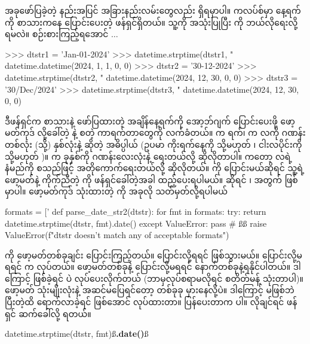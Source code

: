 အခုဖော်ပြခဲ့တဲ့ နည်းအပြင် အခြားနည်းလမ်းတွေလည်း ရှိရမှာပါ။  ကလပ်စ်မှာ နေ့ရက်ကို စာသားကနေ  ပြောင်းပေးတဲ့  ဖန်ရှင်ရှိတယ်။ သူ့ကို အသုံးပြုပြီး  ကို ဘယ်လိုရေးလို့ ရမလဲ။ စဉ်းစားကြည့်ရအောင် $\ldots$

\begin{codetxt}
>>> dtstr1 = 'Jan-01-2024'
>>> datetime.strptime(dtstr1, "%
datetime.datetime(2024, 1, 1, 0, 0)
>>> dtstr2 = '30-12-2024'
>>> datetime.strptime(dtstr2, "%
datetime.datetime(2024, 12, 30, 0, 0)
>>> dtstr3 = '30/Dec/2024'
>>> datetime.strptime(dtstr3, "%
datetime.datetime(2024, 12, 30, 0, 0)
\end{codetxt}
ဒီဖန်ရှင်က စာသားနဲ့ ဖော်ပြထားတဲ့ အချိန်နေ့ရက်ကို  အော့ဘ်ဂျက် ပြောင်းပေးဖို့ ဖော့မတ်ကုဒ်  လို့ခေါ်တဲ့ \fCode{\%} နဲ့ စတဲ့ ကာရက်တာတွေကို လက်ခံတယ်။  က ရက်၊  က   လကို ဂဏန်း တစ်လုံး (သို့) နှစ်လုံးနဲ့ ဆိုတဲ့ အဓိပ္ပါယ် (ဥပမာ ကိုးရက်နေ့ကို  သို့မဟုတ် ၊ ငါးလပိုင်းကို  သို့မဟုတ် )။  က ခုနှစ်ကို ဂဏန်းလေးလုံးနဲ့ ရေးတယ်လို့ ဆိုလိုတာပါ။  ကတော့ လရဲ့ နံမည်ကို  စသည်ဖြင့် အတိုကောက်ရေးတယ်လို့ ဆိုလိုတယ်။  ကို ပြောင်းမယ်ဆိုရင် သူ့ရဲ့ဖော့မတ်နဲ့ ကိုက်ညီတဲ့  ကို ဖန်ရှင်ခေါ်တဲ့အခါ ထည့်ပေးရပါမယ်။  ဆိုရင် ၊  အတွက်  ဖြစ်မှာပါ။ ဖော့မတ်ကုဒ် သုံးထားတဲ့  ကို အခုလို သတ်မှတ်လို့ရပါမယ်
%
\begin{py}
formats = ['%
def parse_date_str2(dtstr):
    for fmt in formats:
        try:
            return datetime.strptime(dtstr, fmt).date()
        except ValueError:
            pass
    # ßß
    raise ValueError(f"{dtstr} doesn't match any of acceptable formats")
\end{py}
%
 ကို ဖော့မတ်တစ်ခုချင်း ပြောင်းကြည့်တယ်။ ပြောင်းလို့ရရင်  ဖြစ်သွားမယ်။ ပြောင်းလို့မရရင်  က   လုပ်တယ်။  ဖော့မတ်တစ်ခုနဲ့ ပြောင်းလို့မရရင် နောက်တစ်ခုနဲ့ရနိုင်ပါတယ်။ ဒါကြောင့်  ဖြစ်ခဲ့ရင်   ပဲ လုပ်ပေးလိုက်တယ် (ဘာမှလုပ်စရာမလိုရင်  စတိတ်မန့် သုံးတာပါ)။ ဖော့မတ် သုံးမျိုးလုံးနဲ့ အဆင်မပြေရင်တော့ တစ်ခုခု မှားနေလို့ပဲ။ ဒါကြောင့်  မဖြစ်ဘဲ   ပြီးတဲ့ထိ ရောက်လာခဲ့ရင်   ဖြစ်အောင်  လုပ်ထားတာ။  ပြန်ပေးတာက  ပါ။  လိုချင်ရင်  ဖန်ရှင် ဆက်ခေါ်လို့ ရတယ်။ 
%
\begin{py}
datetime.strptime(dtstr, fmt)ß\textbf{.date()}ß
\end{py}
%

